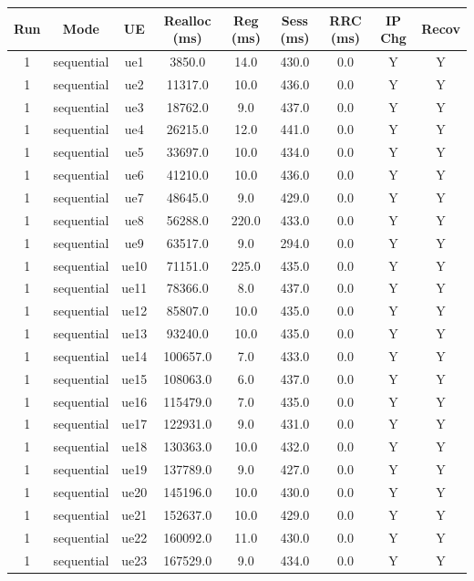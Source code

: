 \begin{table}[ht]
\centering
\begin{tabular}{|c|c|c|c|c|c|c|c|c|}
\hline
Run & Mode & UE & Realloc (ms) & Reg (ms) & Sess (ms) & RRC (ms) & IP Chg & Recov \\
\hline
1 & sequential & ue1 & 3850.0 & 14.0 & 430.0 & 0.0 & Y & Y \\
1 & sequential & ue2 & 11317.0 & 10.0 & 436.0 & 0.0 & Y & Y \\
1 & sequential & ue3 & 18762.0 & 9.0 & 437.0 & 0.0 & Y & Y \\
1 & sequential & ue4 & 26215.0 & 12.0 & 441.0 & 0.0 & Y & Y \\
1 & sequential & ue5 & 33697.0 & 10.0 & 434.0 & 0.0 & Y & Y \\
1 & sequential & ue6 & 41210.0 & 10.0 & 436.0 & 0.0 & Y & Y \\
1 & sequential & ue7 & 48645.0 & 9.0 & 429.0 & 0.0 & Y & Y \\
1 & sequential & ue8 & 56288.0 & 220.0 & 433.0 & 0.0 & Y & Y \\
1 & sequential & ue9 & 63517.0 & 9.0 & 294.0 & 0.0 & Y & Y \\
1 & sequential & ue10 & 71151.0 & 225.0 & 435.0 & 0.0 & Y & Y \\
1 & sequential & ue11 & 78366.0 & 8.0 & 437.0 & 0.0 & Y & Y \\
1 & sequential & ue12 & 85807.0 & 10.0 & 435.0 & 0.0 & Y & Y \\
1 & sequential & ue13 & 93240.0 & 10.0 & 435.0 & 0.0 & Y & Y \\
1 & sequential & ue14 & 100657.0 & 7.0 & 433.0 & 0.0 & Y & Y \\
1 & sequential & ue15 & 108063.0 & 6.0 & 437.0 & 0.0 & Y & Y \\
1 & sequential & ue16 & 115479.0 & 7.0 & 435.0 & 0.0 & Y & Y \\
1 & sequential & ue17 & 122931.0 & 9.0 & 431.0 & 0.0 & Y & Y \\
1 & sequential & ue18 & 130363.0 & 10.0 & 432.0 & 0.0 & Y & Y \\
1 & sequential & ue19 & 137789.0 & 9.0 & 427.0 & 0.0 & Y & Y \\
1 & sequential & ue20 & 145196.0 & 10.0 & 430.0 & 0.0 & Y & Y \\
1 & sequential & ue21 & 152637.0 & 10.0 & 429.0 & 0.0 & Y & Y \\
1 & sequential & ue22 & 160092.0 & 11.0 & 430.0 & 0.0 & Y & Y \\
1 & sequential & ue23 & 167529.0 & 9.0 & 434.0 & 0.0 & Y & Y \\

\end{tabular}
\end{table}
